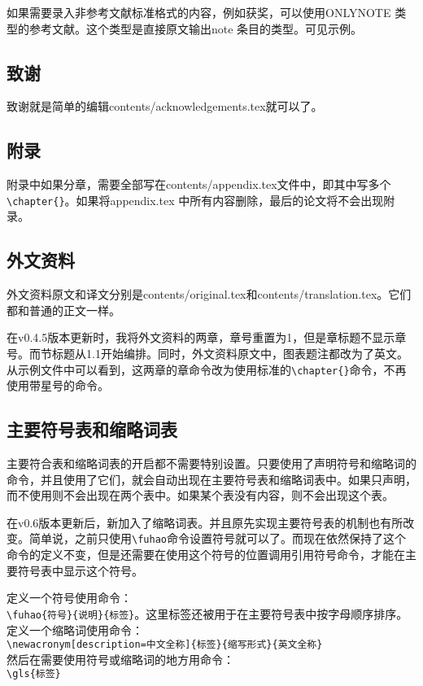如果需要录入非参考文献标准格式的内容，例如获奖，可以使用ONLYNOTE 类型的参考文献。这个类型是直接原文输出note 条目的类型。可见示例\cite{onlynoteexample}。
\subsection{致谢}
致谢就是简单的编辑contents/acknowledgements.tex就可以了。
\subsection{附录}
附录中如果分章，需要全部写在contents/appendix.tex文件中，即其中写多个\verb|\chapter{}|。如果将appendix.tex 中所有内容删除，最后的论文将不会出现附录。
\subsection{外文资料}
\label{translation}
外文资料原文和译文分别是contents/original.tex和contents/translation.tex。它们都和普通的正文一样。

在v0.4.5版本更新时，我将外文资料的两章，章号重置为1，但是章标题不显示章号。而节标题从1.1开始编排。同时，外文资料原文中，图表题注都改为了英文。从示例文件中可以看到，这两章的章命令改为使用标准的\verb|\chapter{}|命令，不再使用带星号的命令。
\subsection{主要符号表和缩略词表}\label{subsection:glossaries}
主要符合表和缩略词表的开启都不需要特别设置。只要使用了声明符号和缩略词的命令，并且使用了它们，就会自动出现在主要符号表和缩略词表中。如果只声明，而不使用则不会出现在两个表中。如果某个表没有内容，则不会出现这个表。

在v0.6版本更新后，新加入了缩略词表。并且原先实现主要符号表的机制也有所改变。简单说，之前只使用\verb|\fuhao|命令设置符号就可以了。而现在依然保持了这个命令的定义不变，但是还需要在使用这个符号的位置调用引用符号命令，才能在主要符号表中显示这个符号。

定义一个符号使用命令：\\
\verb|\fuhao{符号}{说明}{标签}|。这里标签还被用于在主要符号表中按字母顺序排序。\\
定义一个缩略词使用命令：\\
\verb|\newacronym[description=中文全称]{标签}{缩写形式}{英文全称}|\\
然后在需要使用符号或缩略词的地方用命令：\\
\verb|\gls{标签}|

